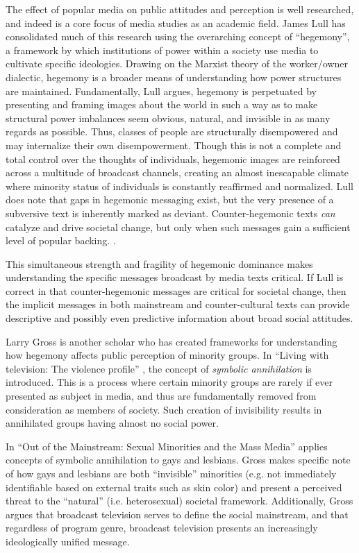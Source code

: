\documentclass[man,12pt]{apa6}
\begin{document}
The effect of popular media on public attitudes and perception is well researched, and indeed is a core focus of media studies as an academic field. James Lull \citeyear{lull2003hegemony} has consolidated much of this research using the overarching concept of ``hegemony'', a framework by which institutions of power within a society use media to cultivate specific ideologies. Drawing on the Marxist theory of the worker/owner dialectic, hegemony is a broader means of understanding how power structures are maintained. Fundamentally, Lull argues, hegemony is perpetuated by presenting and framing images about the world in such a way as to make structural power imbalances seem obvious, natural, and invisible in as many regards as possible. Thus, classes of people are structurally disempowered and may internalize their own disempowerment. Though this is not a complete and total control over the thoughts of individuals, hegemonic images are reinforced across a multitude of broadcast channels, creating an almost inescapable climate where minority status of individuals is constantly reaffirmed and normalized. Lull does note that gaps in hegemonic messaging exist, but the very presence of a subversive text is inherently marked as deviant. Counter-hegemonic texts \emph{can} catalyze and drive societal change, but only when such messages gain a sufficient level of popular backing. \cite{lull2003hegemony}.

This simultaneous strength and fragility of hegemonic dominance makes understanding the specific messages broadcast by media texts critical. If Lull is correct in that counter-hegemonic messages are critical for societal change, then the implicit messages in both mainstream and counter-cultural texts can provide descriptive and possibly even predictive information about broad social attitudes.

Larry Gross is another scholar who has created frameworks for understanding how hegemony affects public perception of minority groups. In ``Living with television: The violence profile'' \cite{gerbner1976living}, the concept of \emph{symbolic annihilation} is introduced. This is a process where certain minority groups are rarely if ever presented as subject in media, and thus are fundamentally removed from consideration as members of society. Such creation of invisibility results in annihilated groups having almost no social power.

In ``Out of the Mainstream: Sexual Minorities and the Mass Media'' \cite{gross} applies concepts of symbolic annihilation to gays and lesbians. Gross makes specific note of how gays and lesbians are both ``invisible'' minorities (e.g. not immediately identifiable based on external traits such as skin color) and present a perceived threat to the ``natural'' (i.e. heterosexual) societal framework. Additionally, Gross argues that broadcast television serves to define the social mainstream, and that regardless of program genre, broadcast television presents an increasingly ideologically unified message.
\end{document}
